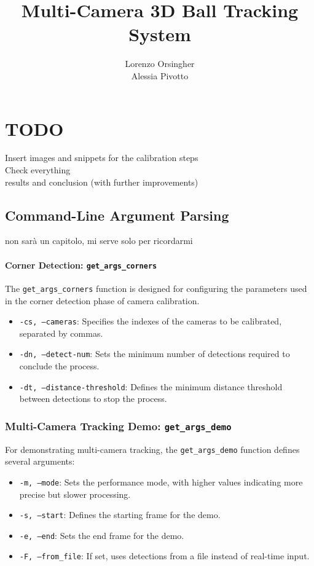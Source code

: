 \documentclass{template}
\title{Multi-Camera 3D Ball Tracking System}
\author{Lorenzo Orsingher\\Alessia Pivotto}
\begin{document}
\chapter{TODO}
Insert images and snippets for the calibration steps
\\Check everything
\\results and conclusion (with further improvements)
\section{Command-Line Argument Parsing}
non sarà un capitolo, mi serve solo per ricordarmi 

\subsubsection{Corner Detection: \texttt{get\_args\_corners}}

The \texttt{get\_args\_corners} function is designed for configuring the parameters used in the corner detection phase of camera calibration. 

\begin{itemize}
    \item \texttt{-cs, --cameras}: Specifies the indexes of the cameras to be calibrated, separated by commas. 
    \item \texttt{-dn, --detect-num}: Sets the minimum number of detections required to conclude the process.
    \item \texttt{-dt, --distance-threshold}: Defines the minimum distance threshold between detections to stop the process.
\end{itemize}

\subsection{Multi-Camera Tracking Demo: \texttt{get\_args\_demo}}

For demonstrating multi-camera tracking, the \texttt{get\_args\_demo} function defines several arguments:

\begin{itemize}
    \item \texttt{-m, --mode}: Sets the performance mode, with higher values indicating more precise but slower processing.
    \item \texttt{-s, --start}: Defines the starting frame for the demo. 
    \item \texttt{-e, --end}: Sets the end frame for the demo. 
    \item \texttt{-F, --from\_file}: If set, uses detections from a file instead of real-time input.
\end{itemize}
\end{document}
